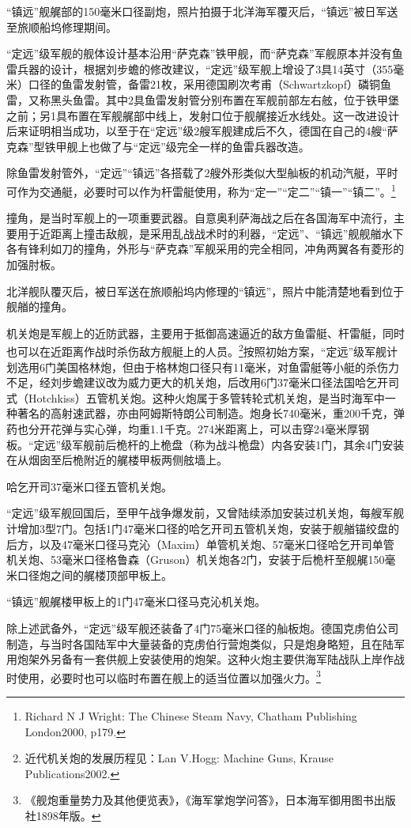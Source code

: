 \documentclass[12pt,UTF8]{ctexbook}
\begin{document}
“镇远”舰艉部的150毫米口径副炮，照片拍摄于北洋海军覆灭后，“镇远”被日军送至旅顺船坞修理期间。

“定远”级军舰的舰体设计基本沿用“萨克森”铁甲舰，而“萨克森”军舰原本并没有鱼雷兵器的设计，根据刘步蟾的修改建议，“定远”级军舰上增设了3具14英寸（355毫米）口径的鱼雷发射管，备雷21枚，采用德国刷次考甫（Schwartzkopf）磷铜鱼雷，又称黑头鱼雷。其中2具鱼雷发射管分别布置在军舰前部左右舷，位于铁甲堡之前；另1具布置在军舰艉部中线上，发射口位于舰艉接近水线处。这一改进设计后来证明相当成功，以至于在“定远”级2艘军舰建成后不久，德国在自己的4艘“萨克森”型铁甲舰上也做了与“定远”级完全一样的鱼雷兵器改造。

除鱼雷发射管外，“定远”“镇远”各搭载了2艘外形类似大型舢板的机动汽艇，平时可作为交通艇，必要时可以作为杆雷艇使用，称为“定一”“定二”“镇一”“镇二”。\footnote{Richard N J Wright: The Chinese Steam Navy, Chatham Publishing London2000, p179.}

撞角，是当时军舰上的一项重要武器。自意奥利萨海战之后在各国海军中流行，主要用于近距离上撞击敌舰，是采用乱战战术时的利器，“定远”、“镇远”舰舰艏水下各有锋利如刀的撞角，外形与“萨克森”军舰采用的完全相同，冲角两翼各有菱形的加强肘板。

北洋舰队覆灭后，被日军送在旅顺船坞内修理的“镇远”，照片中能清楚地看到位于舰艏的撞角。

机关炮是军舰上的近防武器，主要用于抵御高速逼近的敌方鱼雷艇、杆雷艇，同时也可以在近距离作战时杀伤敌方舰艇上的人员。\footnote{近代机关炮的发展历程见：Lan V.Hogg: Machine Guns, Krause Publications2002.}按照初始方案，“定远”级军舰计划选用6门美国格林炮，但由于格林炮口径只有11毫米，对鱼雷艇等小艇的杀伤力不足，经刘步蟾建议改为威力更大的机关炮，后改用6门37毫米口径法国哈乞开司式（Hotchkiss）五管机关炮。这种火炮属于多管转轮式机关炮，是当时海军中一种著名的高射速武器，亦由阿姆斯特朗公司制造。炮身长740毫米，重200千克，弹药也分开花弹与实心弹，均重1.1千克。274米距离上，可以击穿24毫米厚钢板。“定远”级军舰前后桅杆的上桅盘（称为战斗桅盘）内各安装1门，其余4门安装在从烟囱至后桅附近的艉楼甲板两侧舷墙上。

哈乞开司37毫米口径五管机关炮。

“定远”级军舰回国后，至甲午战争爆发前，又曾陆续添加安装过机关炮，每艘军舰计增加3型7门。包括1门47毫米口径的哈乞开司五管机关炮，安装于舰艏锚绞盘的后方，以及47毫米口径马克沁（Maxim）单管机关炮、57毫米口径哈乞开司单管机关炮、53毫米口径格鲁森（Gruson）机关炮各2门，安装于后桅杆至舰艉150毫米口径炮之间的艉楼顶部甲板上。

“镇远”舰艉楼甲板上的1门47毫米口径马克沁机关炮。

除上述武备外，“定远”级军舰还装备了4门75毫米口径的舢板炮。德国克虏伯公司制造，与当时各国陆军中大量装备的克虏伯行营炮类似，只是炮身略短，且在陆军用炮架外另备有一套供舰上安装使用的炮架。这种火炮主要供海军陆战队上岸作战时使用，必要时也可以临时布置在舰上的适当位置以加强火力。\footnote{《舰炮重量势力及其他便览表》，《海军掌炮学问答》，日本海军御用图书出版社1898年版。}
\end{document}
